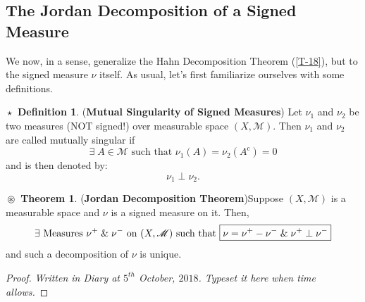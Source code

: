 \documentclass{article}
\theoremstyle{definition}
\newtheorem{definition}{$\boxed{\star}$ Definition}
\newtheorem{theorem}{$\boxed{\boxed{\circledast}}$ Theorem}
\theoremstyle{remark}
\theoremstyle{definition}
\theoremstyle{definition}
\theoremstyle{definition}
\newcommand{\alg}[1]{\mathscr{#1}}
\newcommand{\comp}[1]{#1^{\text{c}}}
\newcommand{\ms}{\perp}
\begin{document}
\newpage

\subsection{The Jordan Decomposition of a Signed Measure}
We now, in a sense, generalize the Hahn Decomposition Theorem (\ref{T-18}), but to the signed measure $ \nu $ itself. As usual, let's first familiarize ourselves with some definitions.
\begin{definition}
	(\textbf{Mutual Singularity of Signed Measures}) Let $ \nu_1 $ and $ \nu_2 $ be two measures (NOT signed!) over measurable space $ (X,\alg{M}) $. Then $ \nu_1 $ and $ \nu_2 $ are called mutually singular if 
	\[\exists \; A\in \alg{M} \text{ such that }\nu_1(A) = \nu_2(\comp{A}) = 0\]
	and is then denoted by:
	\[\nu_1 \ms \nu_2.\]
\end{definition}
\hrulefill
\begin{theorem}(\textbf{Jordan Decomposition Theorem})\label{T-19}
	Suppose $ (X,\alg{M}) $ is a measurable space and $ \nu $ is a signed measure on it. Then, 
	\[\exists \text{ Measures }\nu^{+}\;\&\;\nu^{-}\text{ on $ (X,\alg{M}) $ such that } \boxed{\nu= \nu^{+} - \nu^{-} \;\&\; \nu^{+}\ms \nu^{-}}\]
	and such a decomposition of $ \nu $ is unique.
\end{theorem}
\begin{proof}
	\emph{Written in Diary at $ 5^{th} $ October, $ 2018 $. Typeset it here when time allows.}	
\end{proof}
\newpage
\end{document}
